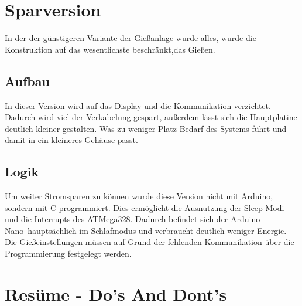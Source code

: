 \documentclass[]{IEEEtran}
\begin{document}
	
	
\section{Sparversion}
	In der der günstigeren Variante der Gießanlage wurde alles, wurde die Konstruktion auf das wesentlichste beschränkt,das Gießen.
	
	\subsection{Aufbau}
	In dieser Version wird auf das Display und die Kommunikation verzichtet.
	Dadurch wird viel der Verkabelung gespart, außerdem lässt sich die Hauptplatine deutlich kleiner gestalten.
	Was zu weniger Platz Bedarf des Systems führt und damit in ein kleineres Gehäuse passt.
	\subsection{Logik}
	Um weiter Stromsparen zu können wurde diese Version nicht mit Arduino, sondern mit C programmiert.
	Dies ermöglicht die Ausnutzung der Sleep Modi und die Interrupts des ATMega328. 
	Dadurch befindet sich der \glqq Arduino Nano\grqq \ hauptsächlich im Schlafmodus und verbraucht deutlich weniger Energie.
	Die Gießeinstellungen müssen auf Grund der fehlenden Kommunikation über die Programmierung festgelegt werden.
	  
	
	\section{Resüme - Do's And Dont's}	
\end{document}
